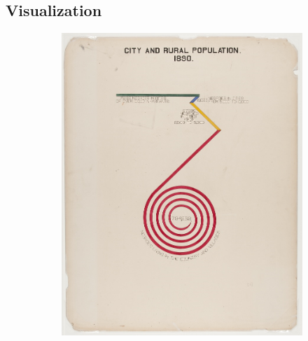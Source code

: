 \subsection{Visualization}






\begin{figure}[H]
    \begin{subfigure}{.24\textwidth}
        \includegraphics[width=1\textwidth]{figures/intro/du_bois_spinny.png}
        \caption{}
        \label{fig:intro_dpa}
    \end{subfigure}
    \begin{subfigure}{.24\textwidth}

\end{subfigure}
\end{figure}
